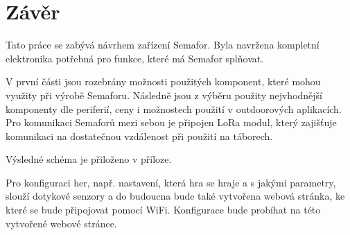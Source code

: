 \chapter*{Závěr}
{}

Tato práce se zabývá návrhem zařízení Semafor. Byla navržena kompletní elektronika potřebná pro funkce, které má Semafor splňovat. 

V první části jsou rozebrány možnosti použitých komponent, které mohou využity při výrobě Semaforu. Následně jsou z výběru použity nejvhodnější 
komponenty dle periferií, ceny i možnostech použití v outdoorových aplikacích.
Pro komunikaci Semaforů mezi sebou je připojen LoRa modul, který zajišťuje komunikaci na dostatečnou vzdálenost při použití na táborech. 

Výsledné schéma je přiloženo v příloze. 

Pro konfiguraci her, např. nastavení, která hra se hraje a s jakými parametry, slouží dotykové senzory a do budoucna bude také vytvořena 
webová stránka, ke které se bude připojovat pomocí WiFi. Konfigurace bude probíhat na této vytvořené webové stránce. 